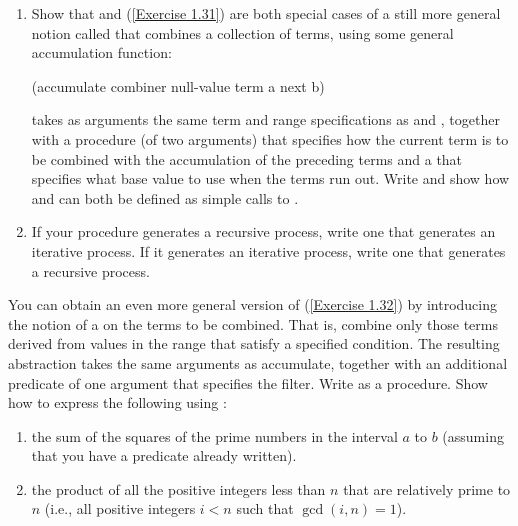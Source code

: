 \begin{exercise}
	\label{Exercise 1.32}
	\begin{enumerate}[label = \alph*., leftmargin = *]

		\item
			Show that  and  (\cref{Exercise 1.31}) are both special cases of a still more general notion called  that combines a collection of terms, using some general accumulation function:
			\begin{scheme}
			  (accumulate combiner null-value term a next b)
			\end{scheme}

			 takes as arguments the same term and range specifications as  and , together with a  procedure (of two arguments) that specifies how the current term is to be combined with the accumulation of the preceding terms and a  that specifies what base value to use when the terms run out.
			Write  and show how  and  can both be defined as simple calls to .

		\item
			If your  procedure generates a recursive process, write one that generates an iterative process.
			If it generates an iterative process, write one that generates a recursive process.

	\end{enumerate}
\end{exercise}



\begin{exercise}
	\label{Exercise 1.33}
	You can obtain an even more general version of  (\cref{Exercise 1.32}) by introducing the notion of a  on the terms to be combined.
	That is, combine only those terms derived from values in the range that satisfy a specified condition.
	The resulting  abstraction takes the same arguments as accumulate, together with an additional predicate of one argument that specifies the filter.
	Write  as a procedure.
	Show how to express the following using :
	\begin{enumerate}[label = \alph*., leftmargin = *]

		\item
			the sum of the squares of the prime numbers in the interval \( a \) to \( b \) (assuming that you have a  predicate already written).

		\item
			the product of all the positive integers less than \( n \) that are relatively prime to \( n \) (i.e., all positive integers \( i < n \) such that \( \gcd(i, n) = 1 \)).

	\end{enumerate}
\end{exercise}
